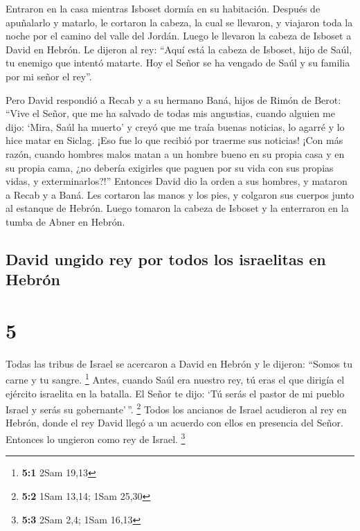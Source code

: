  Entraron en la casa mientras Isboset dormía en su
habitación. Después de apuñalarlo y matarlo, le cortaron la cabeza, la
cual se llevaron, y viajaron toda la noche por el camino del valle del
Jordán.  Luego le llevaron la cabeza de Isboset a David en
Hebrón. Le dijeron al rey: ``Aquí está la cabeza de Isboset, hijo de
Saúl, tu enemigo que intentó matarte. Hoy el Señor se ha vengado de Saúl
y su familia por mi señor el rey''.

 Pero David respondió a Recab y a su hermano Baná, hijos
de Rimón de Berot: ``Vive el Señor, que me ha salvado de todas mis
angustias,  cuando alguien me dijo: `Mira, Saúl ha
muerto' y creyó que me traía buenas noticias, lo agarré y lo hice matar
en Siclag. ¡Eso fue lo que recibió por traerme sus noticias!
 ¡Con más razón, cuando hombres malos matan a un hombre
bueno en su propia casa y en su propia cama, ¿no debería exigirles que
paguen por su vida con sus propias vidas, y exterminarlos?!''
 Entonces David dio la orden a sus hombres, y mataron a
Recab y a Baná. Les cortaron las manos y los pies, y colgaron sus
cuerpos junto al estanque de Hebrón. Luego tomaron la cabeza de Isboset
y la enterraron en la tumba de Abner en Hebrón.

\hypertarget{david-ungido-rey-por-todos-los-israelitas-en-hebruxf3n}{%
\subsection{David ungido rey por todos los israelitas en
Hebrón}\label{david-ungido-rey-por-todos-los-israelitas-en-hebruxf3n}}

\hypertarget{section-4}{%
\section{5}\label{section-4}}

 Todas las tribus de Israel se acercaron a David en Hebrón
y le dijeron: ``Somos tu carne y tu sangre. \footnote{\textbf{5:1} 2Sam
  19,13}  Antes, cuando Saúl era nuestro rey, tú eras el
que dirigía el ejército israelita en la batalla. El Señor te dijo: `Tú
serás el pastor de mi pueblo Israel y serás su gobernante'\,''.
\footnote{\textbf{5:2} 1Sam 13,14; 1Sam 25,30}  Todos los
ancianos de Israel acudieron al rey en Hebrón, donde el rey David llegó
a un acuerdo con ellos en presencia del Señor. Entonces lo ungieron como
rey de Israel. \footnote{\textbf{5:3} 2Sam 2,4; 1Sam 16,13}

